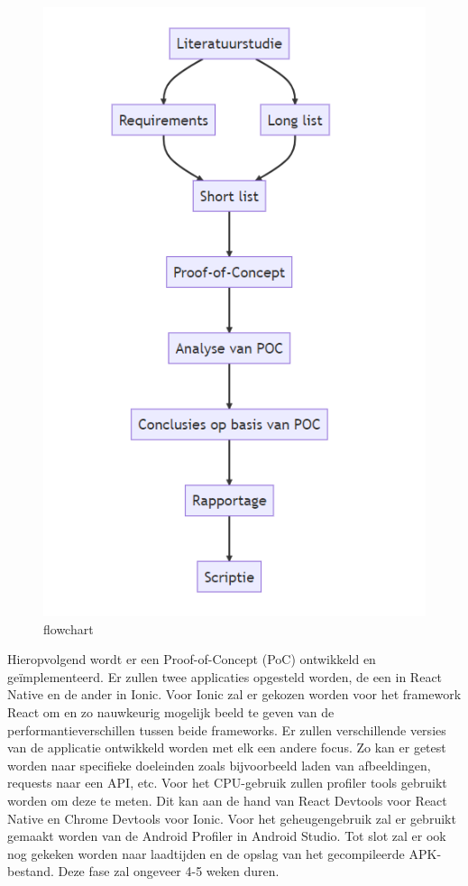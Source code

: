 \begin{figure}
  \centering
  \includegraphics[width=0.7\linewidth]{img/flowchart}
  \caption{flowchart}
  \label{fig:flowchart}
\end{figure}

Hieropvolgend wordt er een Proof-of-Concept (PoC) ontwikkeld en geïmplementeerd. Er zullen twee applicaties opgesteld worden, de een in React Native en de ander in Ionic. Voor Ionic zal er gekozen worden voor het framework React om en zo nauwkeurig mogelijk beeld te geven van de performantieverschillen tussen beide frameworks. Er zullen verschillende versies van de applicatie ontwikkeld worden met elk een andere focus. Zo kan er getest worden naar specifieke doeleinden zoals bijvoorbeeld laden van afbeeldingen, requests naar een API, etc. Voor het CPU-gebruik zullen profiler tools gebruikt worden om deze te meten. Dit kan aan de hand van React Devtools voor React Native en Chrome Devtools voor Ionic. Voor het geheugengebruik zal er gebruikt gemaakt worden van de Android Profiler in Android Studio. Tot slot zal er ook nog gekeken worden naar laadtijden en de opslag van het gecompileerde APK-bestand. Deze fase zal ongeveer 4-5 weken duren.

